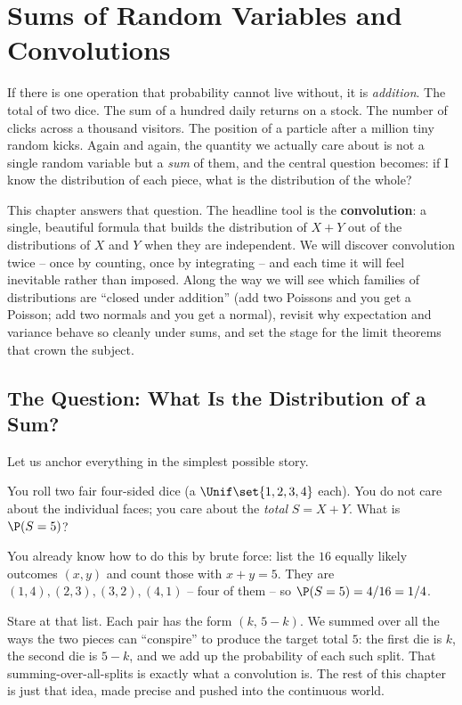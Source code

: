 \chapter{Sums of Random Variables and Convolutions}

If there is one operation that probability cannot live without, it is
\emph{addition}. The total of two dice. The sum of a hundred daily returns
on a stock. The number of clicks across a thousand visitors. The position
of a particle after a million tiny random kicks. Again and again, the
quantity we actually care about is not a single random variable but a
\emph{sum} of them, and the central question becomes: if I know the
distribution of each piece, what is the distribution of the whole?

This chapter answers that question. The headline tool is the
\textbf{convolution}: a single, beautiful formula that builds the
distribution of $X+Y$ out of the distributions of $X$ and $Y$ when they
are independent. We will discover convolution twice -- once by counting,
once by integrating -- and each time it will feel inevitable rather than
imposed. Along the way we will see which families of distributions are
``closed under addition'' (add two Poissons and you get a Poisson; add two
normals and you get a normal), revisit why expectation and variance behave
so cleanly under sums, and set the stage for the limit theorems that crown
the subject.

\chapterline

\section{The Question: What Is the Distribution of a Sum?}
\label{ch17:question}

Let us anchor everything in the simplest possible story.

\begin{intuitionbox}
You roll two fair four-sided dice (a $\Unif\set{1,2,3,4}$ each). You do
not care about the individual faces; you care about the \emph{total}
$S = X + Y$. What is $\P(S = 5)$?

You already know how to do this by brute force: list the $16$ equally
likely outcomes $(x,y)$ and count those with $x+y=5$. They are
$(1,4),(2,3),(3,2),(4,1)$ -- four of them -- so $\P(S=5)=4/16=1/4$.

Stare at that list. Each pair has the form $(k,\,5-k)$. We summed over all
the ways the two pieces can ``conspire'' to produce the target total $5$:
the first die is $k$, the second die is $5-k$, and we add up the
probability of each such split. That summing-over-all-splits is exactly
what a convolution is. The rest of this chapter is just that idea, made
precise and pushed into the continuous world.
\end{intuitionbox}

